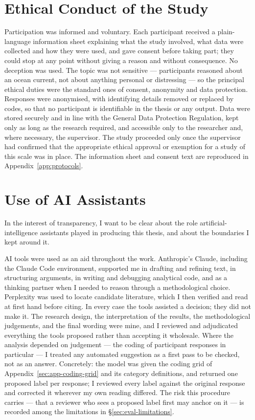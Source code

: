 \section{Ethical Conduct of the Study}
\label{app:ethics-conduct}

Participation was informed and voluntary. Each participant received a plain-language information sheet explaining what the study involved, what data were collected and how they were used, and gave consent before taking part; they could stop at any point without giving a reason and without consequence. No deception was used. The topic was not sensitive --- participants reasoned about an ocean current, not about anything personal or distressing --- so the principal ethical duties were the standard ones of consent, anonymity and data protection. Responses were anonymised, with identifying details removed or replaced by codes, so that no participant is identifiable in the thesis or any output. Data were stored securely and in line with the General Data Protection Regulation, kept only as long as the research required, and accessible only to the researcher and, where necessary, the supervisor. The study proceeded only once the supervisor had confirmed that the appropriate ethical approval or exemption for a study of this scale was in place. The information sheet and consent text are reproduced in Appendix~\ref{app:protocols}.
\section{Use of AI Assistants}
\label{app:ai-use}

In the interest of transparency, I want to be clear about the role artificial-intelligence assistants played in producing this thesis, and about the boundaries I kept around it.

AI tools were used as an aid throughout the work. Anthropic's Claude, including the Claude Code environment, supported me in drafting and refining text, in structuring arguments, in writing and debugging analytical code, and as a thinking partner when I needed to reason through a methodological choice. Perplexity was used to locate candidate literature, which I then verified and read at first hand before citing. In every case the tools assisted a decision; they did not make it. The research design, the interpretation of the results, the methodological judgements, and the final wording were mine, and I reviewed and adjudicated everything the tools proposed rather than accepting it wholesale. Where the analysis depended on judgement --- the coding of participant responses in particular --- I treated any automated suggestion as a first pass to be checked, not as an answer. Concretely: the model was given the coding grid of Appendix~\ref{sec:app-coding-grid} and its category definitions, and returned one proposed label per response; I reviewed every label against the original response and corrected it wherever my own reading differed. The risk this procedure carries --- that a reviewer who sees a proposed label first may anchor on it --- is recorded among the limitations in \S\ref{sec:eval-limitations}.


